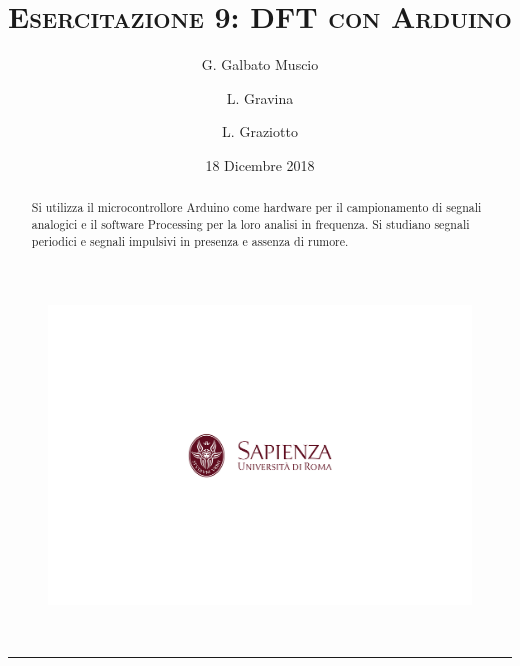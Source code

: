 \documentclass[10pt,oneside,a4paper]{article}
\title{\textsc{\textbf{Esercitazione 9}: DFT con Arduino}}
\author{\small{G. Galbato Muscio} \and \small{L. Gravina} \and \small{L. Graziotto}}
\date{18 Dicembre 2018}
\begin{document}
	\begin{figure}
		\centering
		\includegraphics[scale=0.5, trim={2.8cm 8.9cm 0 9cm}, clip]{logo.png}
	\end{figure}
	\maketitle
	\begin{center} 
		 \\
	\end{center}
\hrule
\vspace{0.5cm}
\renewcommand{\abstractname}{Abstract}
\begin{abstract}
Si utilizza il microcontrollore Arduino come hardware per il campionamento di segnali analogici e il software Processing per la loro analisi in frequenza. Si studiano segnali periodici e segnali impulsivi in presenza e assenza di rumore.
\end{abstract}
\vspace{4cm}
\tableofcontents %
\newpage


\pagebreak
\end{document}
